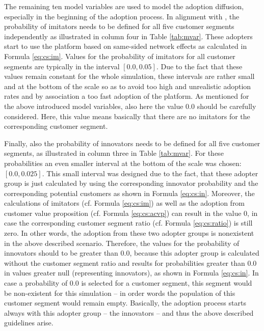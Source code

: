The remaining ten model variables are used to model the adoption diffusion, especially in the beginning of the adoption process. In alignment with \citet[p. 19]{Sterman2001}, the probability of imitators needs to be defined for all five customer segments independently as illustrated in column four in Table \ref{tab:mvar}. These adopters start to use the platform based on same-sided network effects as calculated in Formula \ref{eq:cs:im}. Values for the probability of imitators for all customer segments are typically in the interval $[0.0, 0.05]$. Due to the fact that these values remain constant for the whole simulation, these intervals are rather small and at the bottom of the scale so as to avoid too high and unrealistic adoption rates and by association a too fast adoption of the platform. As mentioned for the above introduced model variables, also here the value $0.0$ should be carefully considered. Here, this value means basically that there are no imitators for the corresponding customer segment.

Finally, also the probability of innovators needs to be defined for all five customer segments, as illustrated in column three in Table \ref{tab:mvar}. For these probabilities an even smaller interval at the bottom of the scale was chosen: $[0.0,0.025]$. This small interval was designed due to the fact, that these adopter group is just calculated by using the corresponding innovator probability and the corresponding potential customers as shown in Formula \ref{eq:cs:in}. Moreover, the calculations of imitators (cf. Formula \ref{eq:cs:im}) as well as the adoption from customer value proposition (cf. Formula \ref{eq:cs:acvp}) can result in the value $0$, in case the corresponding customer segment ratio (cf. Formula \ref{eq:cs:ratio}) is still zero. In other words, the adoption from these two adopter groups is nonexistent in the above described scenario. Therefore, the values for the probability of innovators should to be greater than $0.0$, because this adopter group is calculated without the customer segment ratio and results for probabilities greater than $0.0$ in values greater null (representing innovators), as shown in Formula \ref{eq:cs:in}. In case a probability of $0.0$ is selected for a customer segment, this segment would be non-existent for this simulation -- in order words the population of this customer segment would remain empty. Basically, the adoption process starts always with this adopter group -- the innovators -- and thus the above described guidelines arise.


